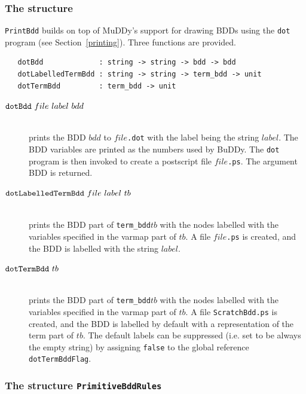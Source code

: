 \documentclass[12pt,fleqn]{book}
\renewcommand{\t}[1]{\mbox{\tt #1}}
\newcommand\termbddty{\texttt{term\_bdd}{}}
\newcommand{\Buddy}{BuDDy{}}
\newcommand{\Muddy}{MuDDy{}}
\begin{document}
\subsubsection{The structure }\label{PrintBdd}

\t{PrintBdd} builds on top of \Muddy's support for drawing BDDs using the \t{dot}
program (see Section~\ref{printing}). Three functions are provided.

\begin{verbatim}
   dotBdd             : string -> string -> bdd -> bdd
   dotLabelledTermBdd : string -> string -> term_bdd -> unit
   dotTermBdd         : term_bdd -> unit
\end{verbatim}

\begin{description}
\item[$\t{dotBdd}~file~label~bdd$]\mbox{}\\
prints the BDD $bdd$ to $file$\t{.dot} with
the label being the string $label$. The BDD variables are printed as the numbers used by \Buddy{}.
The \t{dot} program is then invoked to create 
a postscript file $file$\t{.ps}. The argument BDD is returned.

\item[$\t{dotLabelledTermBdd}~file~label~tb$]\mbox{}\\
prints the
BDD part of \termbddty $tb$ with the nodes labelled with
the variables specified in the varmap part of $tb$. A file $file$\t{.ps}
is created, and the BDD is labelled with the string $label$.


\item[$\t{dotTermBdd}~tb$]\mbox{}\\
prints the
BDD part of \termbddty $tb$ with the nodes labelled with
the variables specified in the varmap part of $tb$. A file \t{ScratchBdd.ps}
is created, and the BDD is labelled by default with a representation
of the term part of $tb$. The default labels
can be suppressed (i.e. set to be always the empty string) by assigning \t{false}
to the global reference \t{dotTermBddFlag}.
\end{description}

\subsubsection{The structure \t{PrimitiveBddRules}}\label{PrimitiveBddRules}
\end{document}
